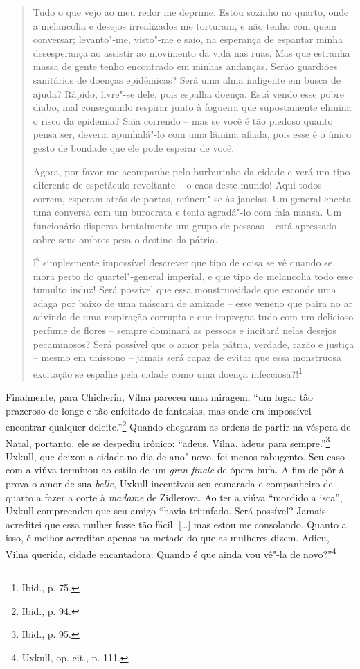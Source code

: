 \begin{quote}
Tudo o que vejo ao meu redor me deprime. Estou sozinho no quarto, onde a
melancolia e desejos irrealizados me torturam, e não tenho com quem
conversar; levanto"-me, visto"-me e saio, na esperança de espantar minha
desesperança ao assistir ao movimento da vida nas ruas. Mas que estranha
massa de gente tenho encontrado em minhas andanças. Serão guardiões
sanitários de doenças epidêmicas? Será uma alma indigente em busca de
ajuda? Rápido, livre"-se dele, pois espalha doença. Está vendo esse pobre
diabo, mal conseguindo respirar junto à fogueira que supostamente
elimina o risco da epidemia? Saia correndo -- mas se você é tão piedoso
quanto pensa ser, deveria apunhalá"-lo com uma lâmina afiada, pois esse é
o único gesto de bondade que ele pode esperar de você.

Agora, por favor me acompanhe pelo burburinho da cidade e verá um tipo
diferente de espetáculo revoltante -- o caos deste mundo! Aqui todos
correm, esperam atrás de portas, reúnem"-se às janelas. Um general enceta
uma conversa com um burocrata e tenta agradá"-lo com fala mansa. Um
funcionário dispersa brutalmente um grupo de pessoas -- está apressado --
sobre seus ombros pesa o destino da pátria.

É simplesmente impossível descrever que tipo de coisa se vê quando se
mora perto do quartel"-general imperial, e que tipo de melancolia todo
esse tumulto induz! Será possível que essa monstruosidade que esconde
uma adaga por baixo de uma máscara de amizade -- esse veneno que paira no
ar advindo de uma respiração corrupta e que impregna tudo com um
delicioso perfume de flores -- sempre dominará as pessoas e incitará
nelas desejos pecaminosos? Será possível que o amor pela pátria,
verdade, razão e justiça -- mesmo em uníssono -- jamais será capaz de
evitar que essa monstruosa excitação se espalhe pela cidade como uma
doença infecciosa?!\footnote{Ibid., p. 75.}
\end{quote}

Finalmente, para Chicherin, Vilna pareceu uma miragem, ``um lugar tão
prazeroso de longe e tão enfeitado de fantasias, mas onde era impossível
encontrar qualquer deleite.''\footnote{Ibid., p. 94.} Quando chegaram as
ordens de partir na véspera de Natal, portanto, ele se despediu irônico:
``adeus, Vilna, adeus para sempre.''\footnote{Ibid., p. 95.} Uxkull, que
deixou a cidade no dia de ano"-novo, foi menos rabugento. Seu caso com a
viúva terminou ao estilo de um \textit{gran finale} de ópera bufa. A fim
de pôr à prova o amor de sua \textit{belle}, Uxkull incentivou seu camarada e
companheiro de quarto a fazer a corte à \textit{madame} de Zidlerova. Ao ter a
viúva ``mordido a isca'', Uxkull compreendeu que seu amigo ``havia
triunfado. Será possível? Jamais acreditei que essa mulher fosse tão
fácil. [\ldots{}] mas estou me consolando. Quanto a isso, é melhor
acreditar apenas na metade do que as mulheres dizem. Adieu, Vilna
querida, cidade encantadora. Quando é que ainda vou vê"-la de
novo?''\footnote{Uxkull, op. cit., p. 111.}

